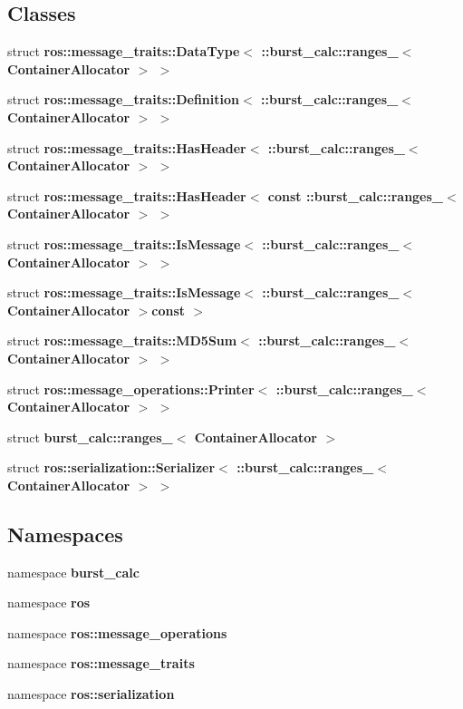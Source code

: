 \subsection*{\-Classes}
\begin{DoxyCompactItemize}
\item 
struct {\bf ros\-::message\-\_\-traits\-::\-Data\-Type$<$ \-::burst\-\_\-calc\-::ranges\-\_\-$<$ Container\-Allocator $>$ $>$}
\item 
struct {\bf ros\-::message\-\_\-traits\-::\-Definition$<$ \-::burst\-\_\-calc\-::ranges\-\_\-$<$ Container\-Allocator $>$ $>$}
\item 
struct {\bf ros\-::message\-\_\-traits\-::\-Has\-Header$<$ \-::burst\-\_\-calc\-::ranges\-\_\-$<$ Container\-Allocator $>$ $>$}
\item 
struct {\bf ros\-::message\-\_\-traits\-::\-Has\-Header$<$ const \-::burst\-\_\-calc\-::ranges\-\_\-$<$ Container\-Allocator $>$ $>$}
\item 
struct {\bf ros\-::message\-\_\-traits\-::\-Is\-Message$<$ \-::burst\-\_\-calc\-::ranges\-\_\-$<$ Container\-Allocator $>$ $>$}
\item 
struct {\bf ros\-::message\-\_\-traits\-::\-Is\-Message$<$ \-::burst\-\_\-calc\-::ranges\-\_\-$<$ Container\-Allocator $>$const  $>$}
\item 
struct {\bf ros\-::message\-\_\-traits\-::\-M\-D5\-Sum$<$ \-::burst\-\_\-calc\-::ranges\-\_\-$<$ Container\-Allocator $>$ $>$}
\item 
struct {\bf ros\-::message\-\_\-operations\-::\-Printer$<$ \-::burst\-\_\-calc\-::ranges\-\_\-$<$ Container\-Allocator $>$ $>$}
\item 
struct {\bf burst\-\_\-calc\-::ranges\-\_\-$<$ Container\-Allocator $>$}
\item 
struct {\bf ros\-::serialization\-::\-Serializer$<$ \-::burst\-\_\-calc\-::ranges\-\_\-$<$ Container\-Allocator $>$ $>$}
\end{DoxyCompactItemize}
\subsection*{\-Namespaces}
\begin{DoxyCompactItemize}
\item 
namespace {\bf burst\-\_\-calc}
\item 
namespace {\bf ros}
\item 
namespace {\bf ros\-::message\-\_\-operations}
\item 
namespace {\bf ros\-::message\-\_\-traits}
\item 
namespace {\bf ros\-::serialization}
\end{DoxyCompactItemize}
